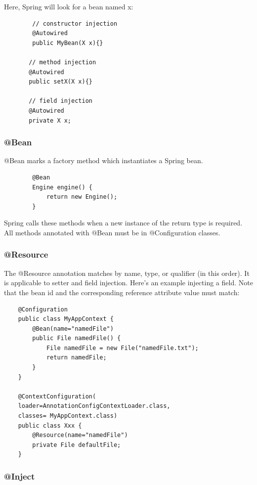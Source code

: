 \documentclass{scrartcl}
\begin{document}
    Here, Spring will look for a bean named x:

    \begin{lstlisting}
        // constructor injection
        @Autowired
        public MyBean(X x){}

       // method injection
       @Autowired
       public setX(X x){}

       // field injection
       @Autowired
       private X x;
    \end{lstlisting}

\subsubsection{@Bean}

    @Bean marks a factory method which instantiates a Spring bean.

    \begin{lstlisting}
        @Bean
        Engine engine() {
            return new Engine();
        }
    \end{lstlisting}

    Spring calls these methods when a new instance of the return type is required. All methods annotated with @Bean must be in @Configuration classes.


\subsubsection{@Resource}

The @Resource annotation matches by name, type, or qualifier (in this order). It is applicable to setter and field injection.
Here’s an example injecting a field. Note that the bean id and the corresponding reference attribute value must match:

\begin{lstlisting}
    @Configuration
    public class MyAppContext {
        @Bean(name="namedFile")
        public File namedFile() {
            File namedFile = new File("namedFile.txt");
            return namedFile;
        }
    }

    @ContextConfiguration(
    loader=AnnotationConfigContextLoader.class,
    classes= MyAppContext.class)
    public class Xxx {
        @Resource(name="namedFile")
        private File defaultFile;
    }
\end{lstlisting}

\subsubsection{@Inject}
\end{document}
